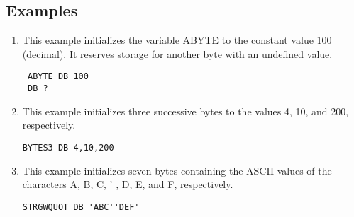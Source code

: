 \subsection*{Examples}
\begin{enumerate}
\item This example initializes the variable ABYTE to the constant value 100 (decimal). It reserves storage for another byte with an undefined value.
\begin{verbatim}
 ABYTE DB 100
 DB ?
\end{verbatim}
\item This example initializes three successive bytes to the values 4, 10, and 200, respectively.
\begin{verbatim}
BYTES3 DB 4,10,200
\end{verbatim}
\item This example initializes seven bytes containing the ASCII values of the characters A, B, C, ' , D, E, and F, respectively.
\begin{verbatim}
STRGWQUOT DB 'ABC''DEF'
\end{verbatim}
\end{enumerate}
